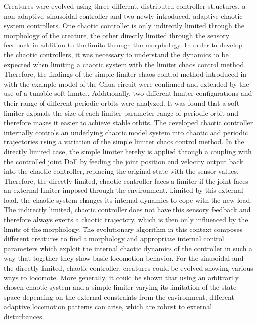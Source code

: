 \documentclass[main]{subfiles}
\begin{document}
Creatures were evolved using three different, distributed controller structures, a non-adaptive, sinusoidal controller and two newly introduced, adaptive chaotic system controllers. %
%
One chaotic controller is only indirectly limited through the morphology of the creature, the other directly limited through the sensory feedback in addition to the limits through the morphology. %
%
In order to develop the chaotic controllers, it was necessary to understand the dynamics to be expected when limiting a chaotic system with the limiter chaos control method. %
%
Therefore, the findings of the simple limiter chaos control method introduced in \cite{bib:Corron2000} with the example model of the Chua circuit \cite{bib:Matsumoto1985} were confirmed and extended by the use of a tunable soft-limiter. %
%
Additionally, two different limiter configurations and their range of different periodic orbits were analyzed. %
%
It was found that a soft-limiter expands the size of each limiter parameter range of periodic orbit and therefore makes it easier to achieve stable orbits. %
%
The developed chaotic controller internally controls an underlying chaotic model system into chaotic and periodic trajectories using a variation of the simple limiter chaos control method. %
%
In the directly limited case, the simple limiter hereby is applied through a coupling with the controlled joint DoF by feeding the joint position and velocity output back into the chaotic controller, replacing the original state with the sensor values. %
%
Therefore, the directly limited, chaotic controller faces a limiter if the joint faces an external limiter imposed through the environment. %
%
Limited by this external load, the chaotic system changes its internal dynamics to cope with the new load. %
%
The indirectly limited, chaotic controller does not have this sensory feedback and therefore always exerts a chaotic trajectory, which is then only influenced by the limits of the morphology. %
%
The evolutionary algorithm in this context composes different creatures to find a morphology and appropriate internal control parameters which exploit the internal chaotic dynamics of the controller in such a way that together they show basic locomotion behavior. %
%
For the sinusoidal and the directly limited, chaotic controller, creatures could be evolved showing various ways to locomote. %
%
More generally, it could be shown that using an arbitrarily chosen chaotic system and a simple limiter varying its limitation of the state space depending on the external constraints from the environment, different adaptive locomotion patterns can arise, which are robust to external disturbances. %
\end{document}
